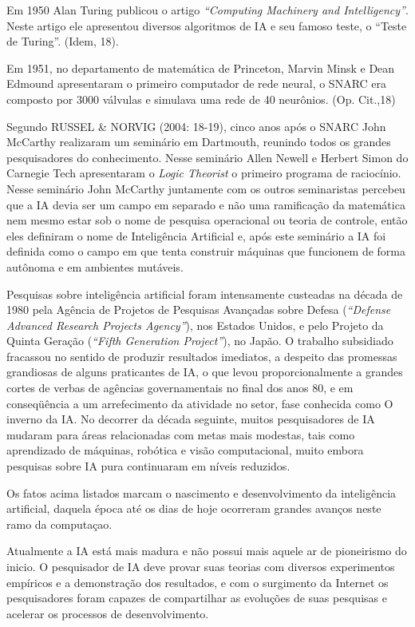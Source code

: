 Em 1950 Alan Turing publicou o artigo \textit{``Computing Machinery and Intelligency''}. Neste artigo ele apresentou diversos algoritmos de IA e seu famoso teste, o ``Teste de Turing''. (Idem, 18).

Em 1951, no departamento de matemática de Princeton, Marvin Minsk e Dean Edmound apresentaram o primeiro computador de rede
neural, o SNARC era composto por 3000 válvulas e simulava uma rede de 40 neurônios. (Op. Cit.,18)

Segundo RUSSEL \& NORVIG (2004: 18-19), cinco anos após o SNARC John McCarthy realizaram um seminário em Dartmouth, reunindo todos os grandes pesquisadores do conhecimento. Nesse seminário Allen Newell e Herbert Simon do Carnegie Tech apresentaram o \textit{Logic Theorist} o primeiro programa de raciocínio. Nesse seminário John McCarthy juntamente com os outros seminaristas percebeu que a IA devia ser um campo em separado e não uma ramificação da matemática nem mesmo estar sob o nome de pesquisa operacional ou teoria de controle, então eles definiram o nome de Inteligência Artificial e, após este seminário a IA foi definida como o campo em que tenta construir máquinas que funcionem de forma autônoma e em ambientes mutáveis.


Pesquisas sobre inteligência artificial foram intensamente custeadas na década de 1980 pela Agência de Projetos de Pesquisas Avançadas sobre Defesa (\textit{“Defense Advanced Research Projects Agency”}), nos Estados Unidos, e pelo Projeto da Quinta Geração (\textit{“Fifth Generation Project”}), no Japão. O trabalho subsidiado fracassou no sentido de produzir resultados imediatos, a despeito das promessas grandiosas de alguns praticantes de IA, o que levou proporcionalmente a grandes cortes de verbas de agências governamentais no final dos anos 80, e em conseqüência a um arrefecimento da atividade no setor, fase conhecida como O inverno da IA. No decorrer da década seguinte, muitos pesquisadores de IA mudaram para áreas relacionadas com metas mais modestas, tais como aprendizado de máquinas, robótica e visão computacional, muito embora pesquisas sobre IA pura continuaram em níveis reduzidos.

Os fatos acima listados marcam o nascimento e desenvolvimento da inteligência artificial, daquela época até os dias de hoje ocorreram grandes avanços neste ramo da computaçao. 

Atualmente a IA está mais madura e não possui mais aquele ar de pioneirismo do inicio. O pesquisador de IA deve provar suas teorias com diversos experimentos empíricos e a demonstração dos resultados, e com o surgimento da Internet os pesquisadores foram capazes de compartilhar as evoluções de suas pesquisas e acelerar os processos de desenvolvimento.

